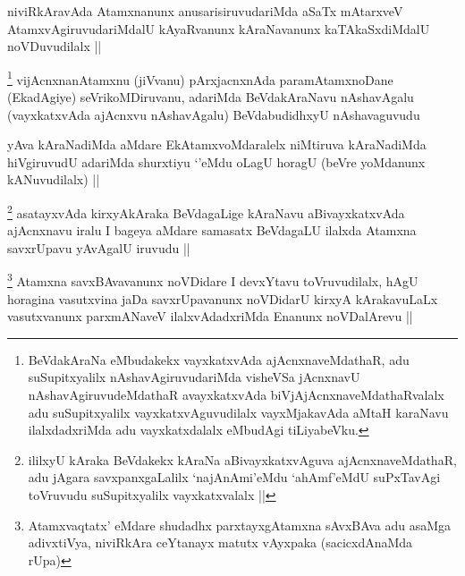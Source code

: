 \begin{artha}
niviRkAravAda Atamxnanunx anusarisiruvudariMda aSaTx mAtarxveV AtamxvAgiruvudariMdalU kAyaRvanunx kAraNavanunx kaTAkaSxdiMdalU noVDuvudilalx ||
\end{artha}



\begin{artha}
\footnote{BeVdakAraNa eMbudakekx vayxkatxvAda ajAcnxnaveMdathaR, adu suSupitxyalilx nAshavAgiruvudariMda visheVSa jAcnxnavU nAshavAgiruvudeMdathaR avayxkatxvAda biVjAjAcnxnaveMdathaRvalalx adu suSupitxyalilx vayxkatxvAguvudilalx vayxMjakavAda aMtaH karaNavu ilalxdadxriMda adu vayxkatxdalalx eMbudAgi tiLiyabeVku.}
vijAcnxnanAtamxnu (jiVvanu) pArxjacnxnAda paramAtamxnoDane (EkadAgiye) seVrikoMDiruvanu, adariMda BeVdakAraNavu nAshavAgalu (vayxkatxvAda ajAcnxvu nAshavAgalu) BeVdabudidhxyU nAshavaguvudu 
\end{artha}

\begin{artha}
yAva kAraNadiMda aMdare EkAtamxvoMdaralelx niMtiruva kAraNadiMda hiVgiruvudU adariMda shurxtiyu `\stext'eMdu oLagU horagU (beVre yoMdanunx kANuvudilalx) ||
\end{artha}


\begin{artha}
\footnote{ililxyU kAraka BeVdakekx kAraNa aBivayxkatxvAguva ajAcnxnaveMdathaR, adu jAgara savxpanxgaLalilx `najAnAmi'eMdu `ahAmf'eMdU suPxTavAgi toVruvudu suSupitxyalilx vayxkatxvalalx ||}
asatayxvAda kirxyAkAraka BeVdagaLige kAraNavu aBivayxkatxvAda ajAcnxnavu iralu I bageya aMdare samasatx BeVdagaLU ilalxda Atamxna savxrUpavu yAvAgalU iruvudu ||
\end{artha}

\begin{artha}
\footnote{Atamxvaqtatx' eMdare shudadhx parxtayxgAtamxna sAvxBAva adu asaMga adivxtiVya, niviRkAra ceYtanayx matutx vAyxpaka (sacicxdAnaMda rUpa)}
Atamxna savxBAvavanunx noVDidare I devxYtavu toVruvudilalx, hAgU horagina vasutxvina jaDa savxrUpavanunx noVDidarU kirxyA kArakavuLaLx vasutxvanunx parxmANaveV ilalxvAdadxriMda Enanunx noVDalArevu ||
\end{artha}

